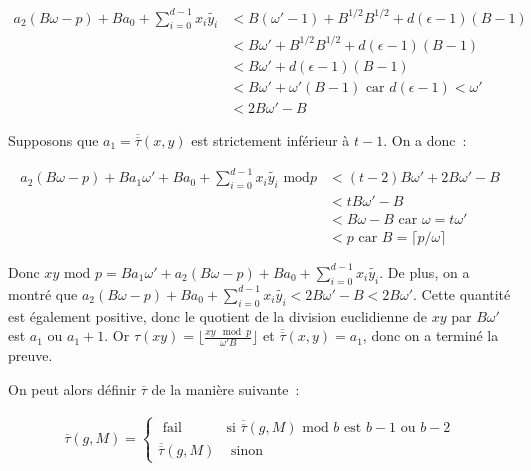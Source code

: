     \begin{align*}
    a_2(B\omega - p) + B a_0 + \sum_{i=0}^{d-1} x_i \tilde{y_i} &< B(\omega' - 1) + B^{1/2}B^{1/2} + d(\epsilon - 1)(B - 1) \\
                            &< B\omega' + B^{1/2}B^{1/2} + d(\epsilon - 1)(B - 1) \\
                            &< B\omega' + d(\epsilon - 1)(B - 1) \\
                            &< B\omega' + \omega'(B - 1) \text{\ car $d(\epsilon - 1) < \omega'$} \\
                            &< 2B\omega' - B
    \end{align*}

    Supposons que $a_1 = \overline{\overline{\tau}}(x,y)$ est strictement inférieur à $t - 1$. On a donc~:

    \begin{align*}
    a_2(B\omega - p) + B a_1\omega' + B a_0 + \sum_{i=0}^{d-1} x_i \tilde{y_i} \text{\ mod} p &< (t - 2)B\omega' + 2B\omega' - B \\
                          &< tB\omega' - B \\
                          &< B\omega - B \text{\ car $\omega = t\omega'$} \\
                          &< p \text{\ car $B = \lceil p/\omega \rceil$}
    \end{align*}

    Donc $xy \text{\ mod } p = B a_1\omega' + a_2(B\omega - p) + B a_0 + \sum_{i=0}^{d-1} x_i \tilde{y_i}$. De plus, on a montré que $a_2(B\omega - p) + B a_0 + \sum_{i=0}^{d-1} x_i \tilde{y_i} < 2B\omega' - B < 2B\omega'$. Cette quantité est également positive, donc le quotient de la division euclidienne de $xy$ par $B\omega'$ est $a_1$ ou $a_1 + 1$. Or $\tau(xy) = \lfloor \frac{xy\mod p}{\omega' B} \rfloor$ et $\overline{\overline{\tau}}(x,y) = a_1$, donc on a terminé la preuve.

    On peut alors définir $\overline{\tau}$ de la manière suivante~:

    \begin{align*}
      \overline{\tau}(g,M) =
      \begin{cases}
        \text{\ fail } & \text{si } \overline{\overline{\tau}}(g,M) \text{\ mod $b$ est $b - 1$ ou $b - 2$} \\
        \overline{\overline{\tau}}(g,M)  & \text{ sinon}
      \end{cases}
    \end{align*}


